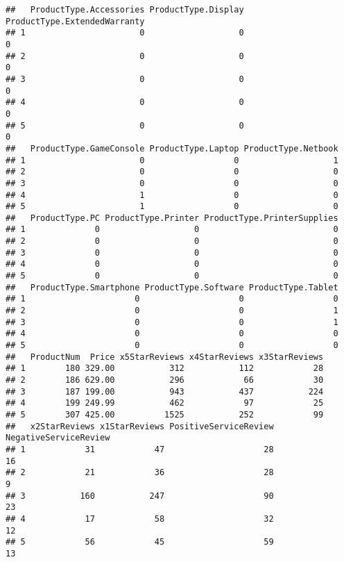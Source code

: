 \documentclass[]{article}
\begin{document}
\begin{verbatim}
##   ProductType.Accessories ProductType.Display ProductType.ExtendedWarranty
## 1                       0                   0                            0
## 2                       0                   0                            0
## 3                       0                   0                            0
## 4                       0                   0                            0
## 5                       0                   0                            0
##   ProductType.GameConsole ProductType.Laptop ProductType.Netbook
## 1                       0                  0                   1
## 2                       0                  0                   0
## 3                       0                  0                   0
## 4                       1                  0                   0
## 5                       1                  0                   0
##   ProductType.PC ProductType.Printer ProductType.PrinterSupplies
## 1              0                   0                           0
## 2              0                   0                           0
## 3              0                   0                           0
## 4              0                   0                           0
## 5              0                   0                           0
##   ProductType.Smartphone ProductType.Software ProductType.Tablet
## 1                      0                    0                  0
## 2                      0                    0                  1
## 3                      0                    0                  1
## 4                      0                    0                  0
## 5                      0                    0                  0
##   ProductNum  Price x5StarReviews x4StarReviews x3StarReviews
## 1        180 329.00           312           112            28
## 2        186 629.00           296            66            30
## 3        187 199.00           943           437           224
## 4        199 249.99           462            97            25
## 5        307 425.00          1525           252            99
##   x2StarReviews x1StarReviews PositiveServiceReview NegativeServiceReview
## 1            31            47                    28                    16
## 2            21            36                    28                     9
## 3           160           247                    90                    23
## 4            17            58                    32                    12
## 5            56            45                    59                    13

\end{verbatim}
\end{document}
